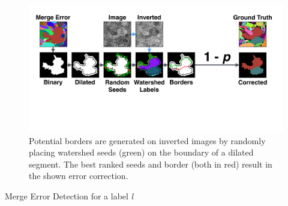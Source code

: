 \documentclass[10pt,twocolumn,letterpaper]{article}
\begin{document}
\begin{figure}[h]
\centering
\includegraphics[width=\linewidth]{gfx/merge_error_v6.pdf}
\vspace{-6mm}
\caption{Potential borders are generated on inverted images by randomly placing watershed seeds (green) on the boundary of a dilated segment. The best ranked seeds and border (both in red) result in the shown error correction.}
\label{fig:merge_error}
\end{figure}

\vspace{-5mm}

%

\begin{algorithm}
\caption{Merge Error Detection for a label \emph{l}}\label{code:mergeerror}
\begin{algorithmic}[1]
	\EndFor

\end{algorithmic}
\end{algorithm}
\end{document}
